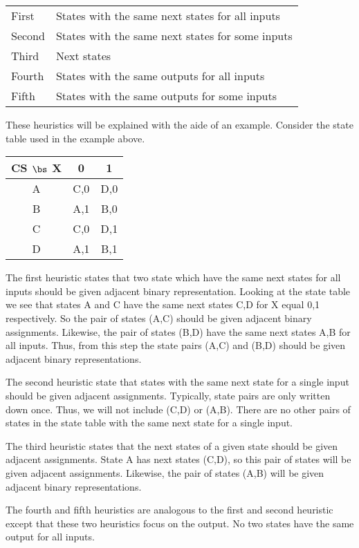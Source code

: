 \begin{tabular}{ll}
First  & States with the same next states for all inputs \\
Second & States with the same next states for some inputs \\
Third  & Next states \\
Fourth & States with the same outputs for all inputs \\
Fifth  & States with the same outputs for some inputs \\
\end{tabular}

These heuristics will be explained with the aide of an
example.  Consider the state table used in the example
above.

\begin{tabular} {c||c|c}
        CS $\bs$ X & 0     & 1    \\ \hline \hline
        A       & C,0  & D,0 \\ \hline
        B       & A,1  & B,0 \\ \hline
        C       & C,0  & D,1 \\ \hline
        D       & A,1  & B,1 \\
\end{tabular}

The first heuristic states that two state which have the same
next states for all inputs should be given adjacent binary
representation.  Looking at the state table we see that states
A and C have the same next states C,D for X equal 0,1
respectively.  So the pair of states (A,C) should be given 
adjacent binary assignments.  Likewise, the pair of 
states (B,D) have the same next states A,B for all inputs.
Thus, from this step the state pairs (A,C) and (B,D) should be 
given adjacent binary representations.

The second heuristic state that states with the same next state
for a single input should be given adjacent assignments.  Typically,
state pairs are only written down once.  Thus, we will not include
(C,D) or (A,B).  There are no other pairs of states in the state
table with the same next state for a single input.

The third heuristic states that the next states of a given state
should be given adjacent assignments.  State A has next states
(C,D), so this pair of states will be given adjacent assignments.
Likewise, the pair of states (A,B) will be given adjacent binary
representations.

The fourth and fifth heuristics are analogous to the first and
second heuristic except that these two heuristics focus on the
output.  No two states have the same output for all inputs.

